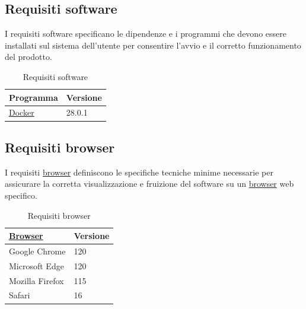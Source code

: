 \subsection{Requisiti software}

I requisiti software specificano le dipendenze e i programmi che devono essere installati sul sistema dell’utente per consentire l’avvio e il corretto funzionamento del prodotto.

\begin{table}[H]
	\centering
	\renewcommand{\arraystretch}{1.15}
		\begin{tabular}{|p{}|p{}|}
			\rowcolor[gray]{0.9}
			\textbf{Programma} & \textbf{Versione} \\
			\hline
			\hyperlink{glossario:docker}{Docker} & 28.0.1 \\
			\hline
	\end{tabular}
	\caption{Requisiti software}
\end{table}

\subsection{Requisiti browser}

I requisiti \hyperlink{glossario:browser}{browser} definiscono le specifiche tecniche minime necessarie per assicurare la corretta visualizzazione e fruizione del software su un \hyperlink{glossario:browser}{browser} web specifico.

\begin{table}[H]
	\centering
	\renewcommand{\arraystretch}{1.15}
		\begin{tabular}{|p{}|p{}|}
			\hline
			\rowcolor[gray]{0.9}
			\textbf{\hyperlink{glossario:browser}{Browser}} & \textbf{Versione} \\
			\hline
			Google Chrome & 120 \\
			\hline
			Microsoft Edge & 120 \\
			\hline
			Mozilla Firefox & 115 \\
			\hline
			Safari & 16 \\
			\hline
	\end{tabular}
	\caption{Requisiti browser}
\end{table}